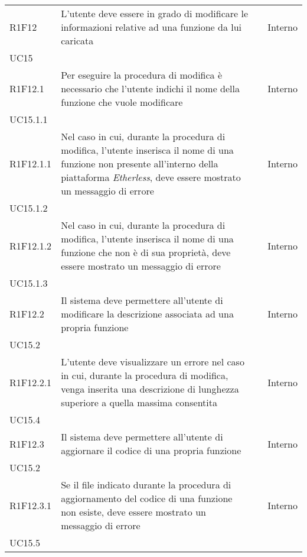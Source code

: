 \begin{longtable}{ 
		>{\centering}p{} 
		>{}p{} 
		>{\centering}p{}
		>{\centering}p{} }
	R1F12 & L'utente deve essere in grado di modificare le informazioni relative 
		ad una funzione da lui caricata 											& \ob & Interno \\ UC15 \tabularnewline
	R1F12.1 & Per eseguire la procedura di modifica è necessario che l'utente 
		indichi il nome della funzione che vuole modificare 							& \ob & Interno \\ UC15.1.1 \tabularnewline
	R1F12.1.1 & Nel caso in cui, durante la procedura di modifica, l'utente 
		inserisca il nome di una funzione non presente all'interno della piattaforma
		\textit{Etherless}, deve essere mostrato un messaggio di errore				& \ob & Interno \\ UC15.1.2 \tabularnewline
	R1F12.1.2 & Nel caso in cui, durante la procedura di modifica, l'utente 
		inserisca il nome di una funzione che non è di sua proprietà, deve essere 
		mostrato un messaggio di errore												& \ob & Interno \\ UC15.1.3 \tabularnewline
	R1F12.2 & Il sistema deve permettere all'utente di modificare la descrizione 
		associata ad una propria funzione 											& \ob & Interno \\ UC15.2 \tabularnewline
	R1F12.2.1 & L'utente deve visualizzare un errore nel caso in cui, durante 
		la procedura di modifica, venga inserita una descrizione di lunghezza
		superiore a quella massima consentita 										& \ob & Interno \\ UC15.4 \tabularnewline
	R1F12.3 & Il sistema deve permettere all'utente di aggiornare il codice di 
		una propria funzione 														& \ob & Interno \\ UC15.2 \tabularnewline	
	R1F12.3.1 & Se il file indicato durante la procedura di aggiornamento del 
		codice di una funzione non esiste, deve essere mostrato un messaggio di 
		errore																		& \ob & Interno \\ UC15.5 \tabularnewline
		

\end{longtable}
